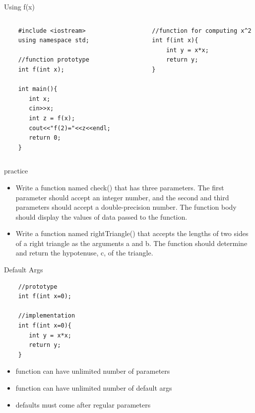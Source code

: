 \documentclass[xcolor={dvipsnames}]{beamer}
\begin{document}
\begin{frame}[fragile]{Using f(x)}
	\begin{columns}
	 \begin{column}{.49\textwidth}
	\begin{verbatim}
	#include <iostream>
	using namespace std;
		
	//function prototype
	int f(int x);

	int main(){
	   int x;
	   cin>>x;
	   int z = f(x);
	   cout<<"f(2)="<<z<<endl;
	   return 0;
	}
	\end{verbatim}
	\end{column}
	\pause

	\begin{column}{.49\textwidth}
		\begin{verbatim}
		//function for computing x^2
		int f(int x){
		    int y = x*x;
		    return y;
		}   
	\end{verbatim}
	\end{column}
	\end{columns}
\end{frame}

\begin{frame}{practice}
	\begin{itemize}
		\item Write a function named check() that has three parameters. The first parameter should accept an integer number, and the second and third parameters should accept a double-precision number. The function body should display the values of
data passed to the function.
		\item Write a function named rightTriangle() that accepts the lengths of two sides of a right triangle as the arguments a and b. The function should determine and return the hypotenuse, c, of the triangle.
	\end{itemize}
\end{frame}

\begin{frame}[fragile]{Default Args}
	\begin{center}
	\begin{verbatim}
	//prototype
	int f(int x=0);

	//implementation
	int f(int x=0){
	   int y = x*x;
	   return y;
	}   
	\end{verbatim}
	\end{center}
	\begin{center}
	\begin{itemize}
		\item function can have unlimited number of parameters
		\item function can have unlimited number of default args
		\item defaults must come after regular parameters
	\end{itemize}
	\end{center}
\end{frame}
\end{document}
